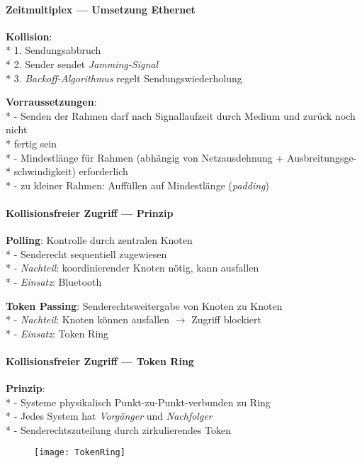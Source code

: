 \paragraph{Zeitmultiplex --- Umsetzung Ethernet}
\begin{items}
  \item \textbf{Kollision}: \\*
    1. Sendungsabbruch \\*
    2. Sender sendet \emph{Jamming-Signal} \\*
    3. \emph{Backoff-Algorithmus} regelt Sendungswiederholung
  \item \textbf{Vorraussetzungen}: \\*
    - Senden der Rahmen darf nach Signallaufzeit durch Medium und zurück noch nicht \\* \phantom{-} \phantom{\( \cdot \)} fertig sein \\*
    - Mindestlänge für Rahmen (abhängig von Netzausdehnung + Ausbreitungsge- \\* \phantom{-} \phantom{\( \cdot \)} schwindigkeit) erforderlich \\*
    - zu kleiner Rahmen: Auffüllen auf Mindestlänge (\emph{padding})
\end{items}

\paragraph{Kollisionsfreier Zugriff --- Prinzip}
\begin{items}
  \item \textbf{Polling}: Kontrolle durch zentralen Knoten \\*
    - Senderecht sequentiell zugewiesen \\*
    - \emph{Nachteil}: koordinierender Knoten nötig, kann ausfallen \\*
    - \emph{Einsatz}: Bluetooth
  \item \textbf{Token Passing}: Senderechtsweitergabe von Knoten zu Knoten \\*
    - \emph{Nachteil}: Knoten können ausfallen \( \to \) Zugriff blockiert \\*
    - \emph{Einsatz}: Token Ring
\end{items}

\paragraph{Kollisionsfreier Zugriff --- Token Ring}
\begin{items}
  \item \textbf{Prinzip}: \\*
    - Systeme physikalisch Punkt-zu-Punkt-verbunden zu Ring \\*
    - Jedes System hat \emph{Vorgänger} und \emph{Nachfolger} \\*
    - Senderechtszuteilung durch zirkulierendes Token
\end{items}
\begin{figure}[H]\centering\label{TokenRing}\texttt{[image: TokenRing]}\end{figure}

